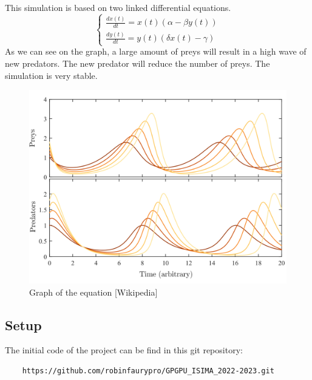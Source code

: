 \documentclass{article}
\begin{document}
This simulation is based on two linked differential equations.
\begin{equation}
\begin{cases}
\frac{dx(t)}{dt} = x(t)(\alpha -\beta y(t))\\
\frac{dy(t)}{dt} = y(t)(\delta x(t)-\gamma)
\end{cases}
\end{equation}
As we can see on the graph, a large amount of preys will result in a high wave of new predators. The new predator will reduce the number of preys. The simulation is very stable.
\begin{figure}[H]
	\centering
	\includegraphics[scale=0.2]{figures/lotka_volterra.png}
	\caption{Graph of the equation  [Wikipedia]}
\end{figure}

\subsection{Setup}

The initial code of the project can be find in this git repository:
\begin{lstlisting}
	https://github.com/robinfaurypro/GPGPU_ISIMA_2022-2023.git
\end{lstlisting}
\end{document}
